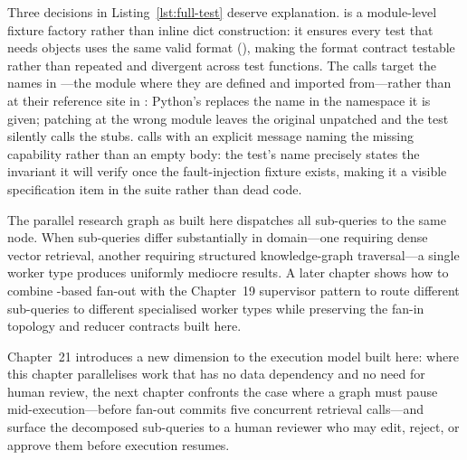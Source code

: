 Three decisions in Listing~\ref{lst:full-test} deserve explanation.
 is a module-level fixture factory rather than inline
dict construction: it ensures every test that needs 
objects uses the same valid  format
(), making the format contract testable
rather than repeated and divergent across test functions. The 
calls target the names in ---the module where
they are defined and imported from---rather than at their reference site in
: Python's  replaces the
name in the namespace it is given; patching at the wrong module leaves the
original unpatched and the test silently calls the 
stubs.  calls
 with an explicit message naming the missing capability
rather than an empty body: the test's name precisely states the invariant it
will verify once the fault-injection fixture exists, making it a visible
specification item in the suite rather than dead code.

\begin{notebox}
The parallel research graph as built here dispatches all sub-queries to the
same  node. When sub-queries differ substantially in
domain---one requiring dense vector retrieval, another requiring structured
knowledge-graph traversal---a single worker type produces uniformly mediocre
results. A later chapter shows how to combine -based fan-out
with the Chapter~19 supervisor pattern to route different sub-queries to
different specialised worker types while preserving the fan-in topology and
reducer contracts built here.
\end{notebox}

Chapter~21 introduces a new dimension to the execution model built here:
where this chapter parallelises work that has no data dependency and no
need for human review, the next chapter confronts the case where a graph
must pause mid-execution---before fan-out commits five concurrent retrieval
calls---and surface the decomposed sub-queries to a human reviewer who may
edit, reject, or approve them before execution resumes.
